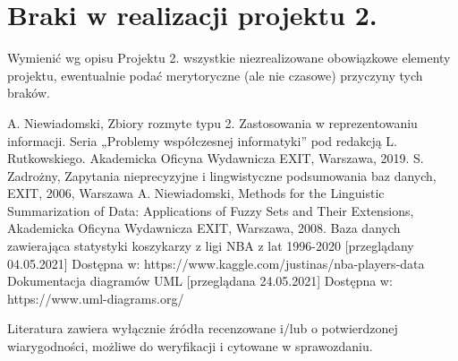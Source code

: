 \documentclass{classrep}
\begin{document}


\section{Braki w realizacji projektu 2.}
Wymienić wg opisu Projektu 2. wszystkie niezrealizowane obowiązkowe elementy projektu, ewentualnie
podać merytoryczne (ale nie czasowe) przyczyny tych braków. 


\begin{thebibliography}{99}
  A. Niewiadomski, Zbiory rozmyte typu 2. Zastosowania w reprezentowaniu informacji.  Seria „Problemy współczesnej informatyki” pod redakcją L. Rutkowskiego. Akademicka Oficyna Wydawnicza EXIT, Warszawa, 2019.
 S. Zadrożny, Zapytania nieprecyzyjne i lingwistyczne podsumowania baz danych, EXIT, 2006, Warszawa
 A. Niewiadomski, Methods for the Linguistic Summarization of Data: Applications of Fuzzy Sets and Their Extensions, Akademicka Oficyna Wydawnicza EXIT, Warszawa, 2008.
 Baza danych zawierająca statystyki koszykarzy z ligi NBA z lat 1996-2020 [przeglądany 04.05.2021] Dostępna w:
https://www.kaggle.com/justinas/nba-players-data
 Dokumentacja diagramów UML [przeglądana 24.05.2021] Dostępna w:
https://www.uml-diagrams.org/
\end{thebibliography}

Literatura zawiera wyłącznie źródła recenzowane i/lub o potwierdzonej wiarygodności,
możliwe do weryfikacji i cytowane w sprawozdaniu. 
\end{document}

